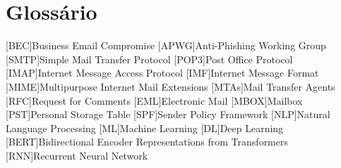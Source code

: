 \chapter{Glossário}

\footnotesize
\SingleSpacing

\begin{multicols}{2}
\begin{acronym}[AAAAAA]

	[BEC]{Business Email Compromise}
    [APWG]{Anti-Phishing Working Group}
	[SMTP]{Simple Mail Transfer Protocol}
	[POP3]{Post Office Protocol}
	[IMAP]{Internet Message Access Protocol}
	[IMF]{Internet Message Format}
	[MIME]{Multipurpose Internet Mail Extensions}
	[MTAs]{Mail Transfer Agents}
	[RFC]{Request for Comments}
	[EML]{Electronic Mail}
	[MBOX]{Mailbox}
	[PST]{Personal Storage Table}
	[SPF]{Sender Policy Framework}
	[NLP]{Natural Language Processing}
	[ML]{Machine Learning}
	[DL]{Deep Learning}
	[BERT]{Bidirectional Encoder Representations from Transformers}
	[RNN]{Recurrent Neural Network}

\end{acronym}
\end{multicols}

